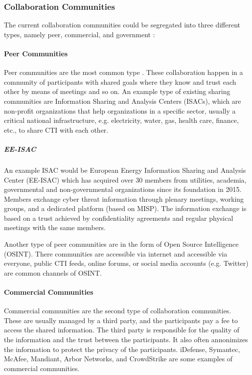 \subsubsection{Collaboration Communities}
\label{subsubsec:collaboration-communities}
The current collaboration communities could be segregated into three different types, namely peer, commercial, and government \cite{connolly_trusted_2014}:

\paragraph{Peer Communities}
Peer communities are the most common type \cite{connolly_trusted_2014}. These collaboration happen in a community of participants with shared goals where they know and trust each other by means of meetings and so on. An example type of existing sharing communities are Information Sharing and Analysis Centers (ISACs), which are non-profit organizations that help organizations in a specific sector, usually a critical national infrastructure, e.g. electricity, water, gas, health care, finance, etc., to share CTI with each other. 

\subparagraph{EE-ISAC}
An example ISAC would be European Energy Information Sharing and Analysis Center (EE-ISAC) which has acquired over 30 members from utilities, academia, governmental and non-governmental organizations since its foundation in 2015. Members exchange cyber threat information through plenary meetings, working groups, and a dedicated platform (based on MISP). 
The information exchange is based on a trust achieved by confidentiality agreements and regular physical meetings with the same members. 
\cite{wallis_ee-isacpractical_2022}

Another type of peer communities are in the form of Open Source Intelligence (OSINT). There communities are accessible via internet and accessible via everyone, public CTI feeds, online forums, or social media accounts (e.g. Twitter) are common channels of OSINT.

\paragraph{Commercial Communities}
Commercial communities are the second type of collaboration communities. These are usually managed by a third party, and the participants pay a fee to access the shared information. The third party is responsible for the quality of the information and the trust between the participants. It also often annonimizes the information to protect the privacy of the participants. iDefense, Symantec, McAfee, Mandiant, Arbor Networks, and CrowdStrike are some examples of commercial communities.


